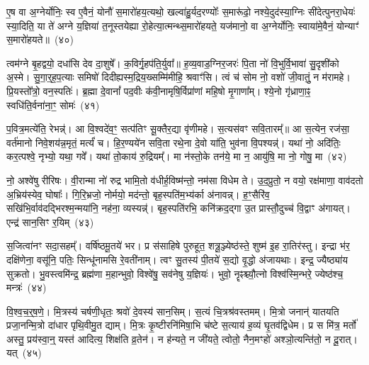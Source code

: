 ए॒ष वा अ॒ग्नेर्योनिः॒ स्व ए॒वैनं॒ योनौ॑ स॒मारो॑हय॒त्यथो॒ खल्वा॑हु॒र्यद॒रण्योः᳚ स॒मारू॑ढो॒ नश्ये॒दुद॑स्या॒ग्निः सी॑देत्पुनरा॒धेयः॑ स्या॒दिति॒ या ते॑ अग्ने य॒ज्ञिया॑ त॒नूस्तयेह्या रो॒हेत्या॒त्मन्थ्स॒मारो॑हयते॒ यज॑मानो॒ वा अ॒ग्नेर्योनिः॒ स्वाया॑मे॒वैनं॒ योन्याꣳ॑ स॒मारो॑हयते॥~(४०)

{}%

त्वम॑ग्ने बृ॒हद्वयो॒ दधा॑सि देव दा॒शुषे᳚। क॒विर्गृ॒हप॑ति॒र्युवा᳚॥ ह॒व्य॒वाड॒ग्निर॒जरः॑ पि॒ता नो॑ वि॒भुर्वि॒भावा॑ सु॒दृशी॑को अ॒स्मे। सु॒गा॒र्॒\mbox{}ह॒प॒त्याः समिषो॑ दिदीह्यस्म॒द्रिय॒ख्सम्मि॑मीहि॒ श्रवाꣳ॑सि। त्वं च॑ सोम नो॒ वशो॑ जी॒वातुं॒ न म॑रामहे। प्रि॒यस्तो᳚त्रो॒ वन॒स्पतिः॑। ब्र॒ह्मा दे॒वानां᳚ पद॒वीः क॑वी॒नामृषि॒र्विप्रा॑णां महि॒षो मृ॒गाणा᳚म्। श्ये॒नो गृ॑ध्राणा॒ꣴ॒ स्वधि॑ति॒र्वना॑ना॒ꣳ॒ सोमः॑~(४१)

प॒वित्र॒मत्ये॑ति॒ रेभन्न्॑। आ वि॒श्वदे॑व॒ꣳ॒ सत्प॑तिꣳ सू॒क्तैर॒द्या वृ॑णीमहे। स॒त्यस॑वꣳ सवि॒तारम्᳚॥ आ स॒त्येन॒ रज॑सा॒ वर्त॑मानो निवे॒शय॑न्न॒मृतं॒ मर्त्यं॑ च। हि॒र॒ण्यये॑न सवि॒ता रथे॒ना दे॒वो या॑ति॒ भुव॑ना वि॒पश्यन्न्॑। यथा॑ नो॒ अदि॑तिः॒ कर॒त्पश्वे॒ नृभ्यो॒ यथा॒ गवे᳚। यथा॑ तो॒काय॑ रु॒द्रियम्᳚। मा न॑स्तो॒के तन॑ये॒ मा न॒ आयु॑षि॒ मा नो॒ गोषु॒ मा~(४२)

नो॒ अश्वे॑षु रीरिषः। वी॒रान्मा नो॑ रुद्र भामि॒तो व॑धीर्\mbox{}ह॒विष्म॑न्तो॒ नम॑सा विधेम ते। उ॒द॒प्रुतो॒ न वयो॒ रक्ष॑माणा॒ वाव॑दतो अ॒भ्रिय॑स्येव॒ घोषाः᳚। गि॒रि॒भ्रजो॒ नोर्मयो॒ मद॑न्तो॒ बृह॒स्पति॑म॒भ्य॑र्का अ॑नावन्न्। ह॒ꣳ॒सैरि॑व॒ सखि॑भि॒र्वाव॑दद्भिरश्म॒न्मया॑नि॒ नह॑ना॒ व्यस्यन्न्॑। बृह॒स्पति॑रभि॒ कनि॑क्रद॒द्गा उ॒त प्रास्तौ॒दुच्च॑ वि॒द्वाꣳ अ॑गायत्। एन्द्र॑ सान॒सिꣳ र॒यिम्~(४३)

स॒जित्वा॑नꣳ सदा॒सहम्᳚। वर्\mbox{}षि॑ष्ठमू॒तये॑ भर। प्र स॑साहिषे पुरुहूत॒ शत्रू॒ञ्ज्येष्ठ॑स्ते॒ शुष्म॑ इ॒ह रा॒तिर॑स्तु। इन्द्रा भ॑र॒ दक्षि॑णेना॒ वसू॑नि॒ पतिः॒ सिन्धू॑नामसि रे॒वती॑नाम्। त्वꣳ सु॒तस्य॑ पी॒तये॑ स॒द्यो वृ॒द्धो अ॑जायथाः। इन्द्र॒ ज्यैष्ठ्या॑य सुक्रतो। भु॒वस्त्वमि॑न्द्र॒ ब्रह्म॑णा म॒हान्भुवो॒ विश्वे॑षु॒ सव॑नेषु य॒ज्ञियः॑। भुवो॒ नॄꣴश्च्यौ॒त्नो विश्व॑स्मि॒न्भरे॒ ज्येष्ठ॑श्च॒ मन्त्रः॑~(४४)

वि॒श्व॒च॒र्॒\mbox{}ष॒णे॒। मि॒त्रस्य॑ चर्\mbox{}षणी॒धृतः॒ श्रवो॑ दे॒वस्य॑ सान॒सिम्। स॒त्यं चि॒त्रश्र॑वस्तमम्। मि॒त्रो जनान्॑ यातयति प्रजा॒नन्मि॒त्रो दा॑धार पृथि॒वीमु॒त द्याम्। मि॒त्रः कृ॒ष्टीरनि॑मिषा॒भि च॑ष्टे स॒त्याय॑ ह॒व्यं घृ॒तव॑द्विधेम। प्र स मि॑त्र॒ मर्तो॑ अस्तु॒ प्रय॑स्वा॒न्॒ यस्त॑ आदित्य॒ शिक्ष॑ति व्र॒तेन॑। न ह॑न्यते॒ न जी॑यते॒ त्वोतो॒ नैन॒मꣳहो॑ अश्ञो॒त्यन्ति॑तो॒ न दू॒रात्। यत्~(४५)

